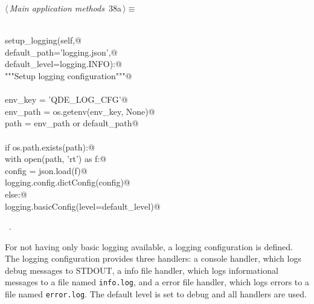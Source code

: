 \documentclass[
    a4paper,      %
    10pt,         %
    openright,    %
    notitlepage,  %
    parskip=half, %
]{scrreprt}       %
\theoremstyle{definition}                    %
\begin{document}
\begin{flushleft} \small
\begin{minipage}{\linewidth}\label{scrap46}\raggedright\small
{} $\langle\,${\itshape Main application methods}\nobreak\ {\footnotesize {38a}}$\,\rangle\equiv$
\vspace{-1exm}
\begin{list}{}{} \item
\mbox{}\lstinline@@\\
\mbox{}\lstinline@def setup_logging(self,@\\
\mbox{}\lstinline@                  default_path='logging.json',@\\
\mbox{}\lstinline@                  default_level=logging.INFO):@\\
\mbox{}\lstinline@    """Setup logging configuration"""@\\
\mbox{}\lstinline@@\\
\mbox{}\lstinline@    env_key  = 'QDE_LOG_CFG'@\\
\mbox{}\lstinline@    env_path = os.getenv(env_key, None)@\\
\mbox{}\lstinline@    path     = env_path or default_path@\\
\mbox{}\lstinline@@\\
\mbox{}\lstinline@    if os.path.exists(path):@\\
\mbox{}\lstinline@        with open(path, 'rt') as f:@\\
\mbox{}\lstinline@            config = json.load(f)@\\
\mbox{}\lstinline@            logging.config.dictConfig(config)@\\
\mbox{}\lstinline@    else:@\\
\mbox{}\lstinline@        logging.basicConfig(level=default_level)@{\NWsep}
\end{list}
\vspace{-1.5ex}
\footnotesize
\begin{list}{}{\setlength{\itemsep}{-\parsep}\setlength{\itemindent}{-\leftmargin}}
\item \NWtxtMacroRefIn\ .

\item{}
\end{list}
\end{minipage}\vspace{4ex}
\end{flushleft}
For not having only basic logging available, a logging configuration is defined.
The logging configuration provides three handlers: a console handler, which logs
debug messages to STDOUT, a info file handler, which logs informational messages
to a file named \verb+info.log+, and a error file handler, which logs errors to
a file named \verb+error.log+. The default level is set to debug and all
handlers are used.
\end{document}
